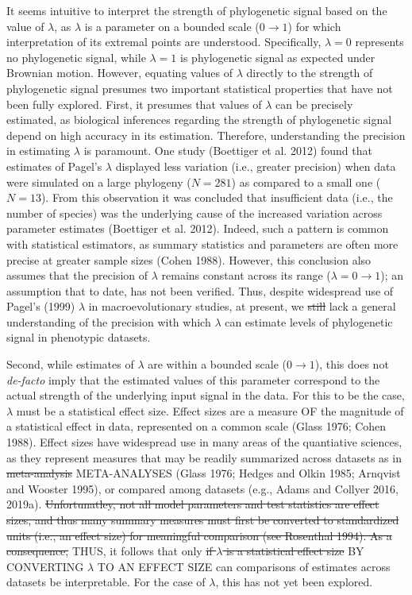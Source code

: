 \documentclass[
]{article}
\begin{document}
It seems intuitive to interpret the strength of phylogenetic signal
based on the value of \(\lambda\), as \(\lambda\) is a parameter on a
bounded scale (\(0\to1\)) for which interpretation of its extremal
points are understood. Specifically, \(\lambda=0\) represents no
phylogenetic signal, while \(\lambda=1\) is phylogenetic signal as
expected under Brownian motion. However, equating values of \(\lambda\)
directly to the strength of phylogenetic signal presumes two important
statistical properties that have not been fully explored. First, it
presumes that values of \(\lambda\) can be precisely estimated, as
biological inferences regarding the strength of phylogenetic signal
depend on high accuracy in its estimation. Therefore, understanding the
precision in estimating \(\lambda\) is paramount. One study (Boettiger
et al. 2012) found that estimates of Pagel's \(\lambda\) displayed less
variation (i.e., greater precision) when data were simulated on a large
phylogeny (\(N=281\)) as compared to a small one (\(N=13\)). From this
observation it was concluded that insufficient data (i.e., the number of
species) was the underlying cause of the increased variation across
parameter estimates (Boettiger et al. 2012). Indeed, such a pattern is
common with statistical estimators, as summary statistics and parameters
are often more precise at greater sample sizes (Cohen 1988). However,
this conclusion also assumes that the precision of \(\lambda\) remains
constant across its range (\(\lambda = 0 \to 1\)); an assumption that to
date, has not been verified. Thus, despite widespread use of Pagel's
(1999) \(\lambda\) in macroevolutionary studies, at present, we
\sout{still} lack a general understanding of the precision with which
\(\lambda\) can estimate levels of phylogenetic signal in phenotypic
datasets. \hfill\break

Second, while estimates of \(\lambda\) are within a bounded scale
(\(0\to1\)), this does not \emph{de-facto} imply that the estimated
values of this parameter correspond to the actual strength of the
underlying input signal in the data. For this to be the case,
\(\lambda\) must be a statistical effect size. Effect sizes are a
measure OF the magnitude of a statistical effect in data, represented on
a common scale (Glass 1976; Cohen 1988). Effect sizes have widespread
use in many areas of the quantiative sciences, as they represent
measures that may be readily summarized across datasets as in
\sout{meta-analysis} META-ANALYSES (Glass 1976; Hedges and Olkin 1985;
Arnqvist and Wooster 1995), or compared among datasets (e.g., Adams and
Collyer 2016, 2019a). \sout{Unfortunatley, not all model parameters and
test statistics are effect sizes, and thus many summary measures must
first be converted to standardized units (i.e., an effect size) for
meaningful comparison (see Rosenthal 1994). As a consequence,} THUS, it
follows that only \sout{if \(\lambda\) is a statistical effect size} BY
CONVERTING \(\lambda\) TO AN EFFECT SIZE can comparisons of estimates
across datasets be interpretable. For the case of \(\lambda\), this has
not yet been explored. \hfill\break
\end{document}
